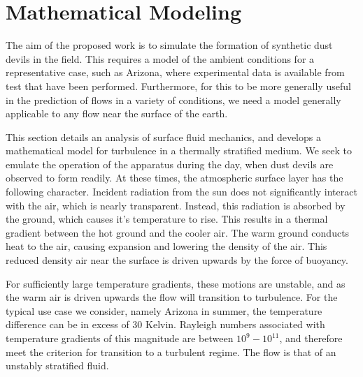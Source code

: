 \section{Mathematical Modeling}
\label{sec:mathmodel}


%
%

The aim of the proposed work is to simulate the formation of synthetic
dust devils in the field. This requires a model of the ambient
conditions for a representative case, such as Arizona, where
experimental data is available from test that have been
performed. Furthermore, for this to be more generally useful in the
prediction of flows in a variety of conditions, we need a model generally
applicable to any flow near the surface of the earth.  

This section details an analysis of surface fluid mechanics, and
develops a mathematical model for turbulence in a thermally stratified
medium. We seek to emulate the operation of the apparatus during the day, 
when dust devils are observed to form readily. 
At these times, the atmospheric surface layer has the following character. 
Incident radiation from the sun does not significantly interact with the
air, which is nearly transparent. Instead, this radiation is absorbed by
the ground, which causes it's temperature to rise. This results in a thermal
gradient between the hot ground and the cooler air. The warm ground
conducts heat to the air, causing expansion and lowering the density
of the air. This reduced density air near the surface is driven upwards
by the force of buoyancy.  

For sufficiently large temperature gradients, these motions are
unstable, and as the warm air is driven upwards the flow will transition
to turbulence. For the typical use case we consider, namely Arizona in
summer, the temperature difference can be in excess of 30 Kelvin. 
Rayleigh numbers associated with temperature gradients of this magnitude
are between $10^{9} - 10^{11}$, and therefore meet the criterion
for transition to a turbulent regime. The flow is that of an unstably
stratified fluid.  

